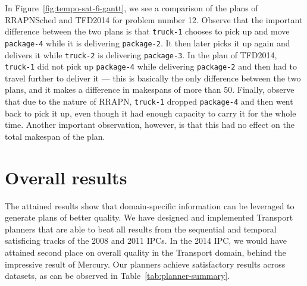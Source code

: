 {In Figure~\ref{fig:tempo-sat-6-gantt}, we see a comparison of the plans
of RRAPNSched and TFD2014 for problem number 12.
Observe that the important difference between the two plans
is that \texttt{truck-1} chooses to pick up and move \texttt{package-4}
while it is delivering \texttt{package-2}. It then later picks it up again and delivers
it while \texttt{truck-2} is delivering \texttt{package-3}.
In the plan of TFD2014, \texttt{truck-1} did not pick up \texttt{package-4}
while delivering \texttt{package-2} and then had to travel further to deliver it
--- this is basically the only difference between the two plans,
and it makes a difference in makespans of more than 50.
Finally, observe that due to the nature of RRAPN, \texttt{truck-1}
dropped \texttt{package-4} and then went back to pick it up, even though it had enough capacity
to carry it for the whole time. Another important observation, however, is that this had no effect on the total makespan
of the plan.

\section{Overall results}

The attained results show that domain-specific information can be leveraged
to generate plans of better quality.
We have designed and implemented Transport planners that are able to beat
all results from the sequential
and temporal satisficing tracks of the 2008 and 2011 IPCs.
In the 2014 IPC, we would have attained second place on overall quality in the Transport domain, behind the impressive result of Mercury. 
Our planners achieve satisfactory results across datasets,
as can be observed in Table~\ref{tab:planner-summary}.

}

